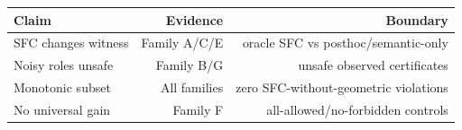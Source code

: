 \begin{tabular}{lrr}
\toprule
Claim & Evidence & Boundary \\
\midrule
SFC changes witness & Family A/C/E & oracle SFC vs posthoc/semantic-only \\
Noisy roles unsafe & Family B/G & unsafe observed certificates \\
Monotonic subset & All families & zero SFC-without-geometric violations \\
No universal gain & Family F & all-allowed/no-forbidden controls \\
\bottomrule
\end{tabular}
